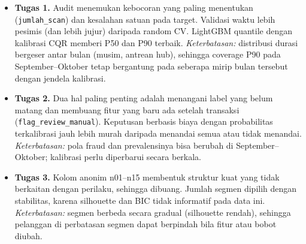 \begin{itemize}
  \item \textbf{Tugas 1.} Audit menemukan kebocoran yang paling menentukan (\texttt{jumlah\_scan}) dan kesalahan satuan pada target. Validasi waktu lebih pesimis
        (dan lebih jujur) daripada random CV. LightGBM quantile dengan kalibrasi CQR memberi P50 dan P90 terbaik.
        \textit{Keterbatasan:} distribusi durasi bergeser antar bulan (musim, antrean hub), sehingga coverage P90 pada September--Oktober tetap bergantung pada
        seberapa mirip bulan tersebut dengan jendela kalibrasi.
  \item \textbf{Tugas 2.} Dua hal paling penting adalah menangani label yang belum matang dan membuang fitur yang baru ada setelah transaksi (\texttt{flag\_review\_manual}).
        Keputusan berbasis biaya dengan probabilitas terkalibrasi jauh lebih murah daripada menandai semua atau tidak menandai.
        \textit{Keterbatasan:} pola fraud dan prevalensinya bisa berubah di September--Oktober; kalibrasi perlu diperbarui secara berkala.
  \item \textbf{Tugas 3.} Kolom anonim n01--n15 membentuk struktur kuat yang tidak berkaitan dengan perilaku, sehingga dibuang. Jumlah segmen dipilih dengan stabilitas,
        karena silhouette dan BIC tidak informatif pada data ini. \textit{Keterbatasan:} segmen berbeda secara gradual (silhouette rendah), sehingga pelanggan di
        perbatasan segmen dapat berpindah bila fitur atau bobot diubah.
\end{itemize}
